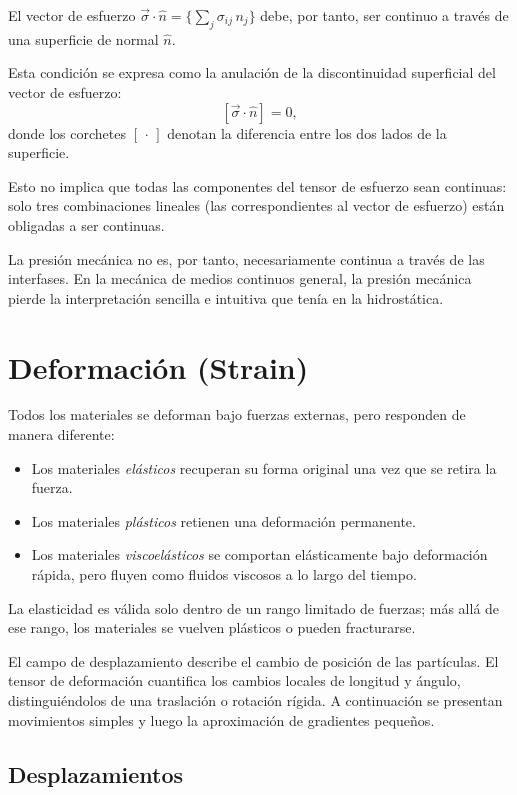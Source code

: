 El vector de esfuerzo $\vec{\sigma}\cdot\hat{n} = \{\sum_j \sigma_{ij}\,n_j\}$ debe, por tanto, ser continuo a través de una superficie de normal $\hat{n}$.

Esta condición se expresa como la anulación de la discontinuidad superficial del vector de esfuerzo:
$$ [\vec{\sigma}\cdot\hat{n}] = 0, $$
donde los corchetes $[\,\cdot\,]$ denotan la diferencia entre los dos lados de la superficie.

Esto no implica que todas las componentes del tensor de esfuerzo sean continuas: solo tres combinaciones lineales (las correspondientes al vector de esfuerzo) están obligadas a ser continuas.

La presión mecánica no es, por tanto, necesariamente continua a través de las interfases. En la mecánica de medios continuos general, la presión mecánica pierde la interpretación sencilla e intuitiva que tenía en la hidrostática.

\section{Deformación (Strain)}

Todos los materiales se deforman bajo fuerzas externas, pero responden de manera diferente:
\begin{itemize}
\item Los materiales \emph{elásticos} recuperan su forma original una vez que se retira la fuerza.
\item Los materiales \emph{plásticos} retienen una deformación permanente.
\item Los materiales \emph{viscoelásticos} se comportan elásticamente bajo deformación rápida, pero fluyen como fluidos viscosos a lo largo del tiempo.
\end{itemize}

La elasticidad es válida solo dentro de un rango limitado de fuerzas; más allá de ese rango, los materiales se vuelven plásticos o pueden fracturarse.

El campo de desplazamiento describe el cambio de posición de las partículas. El tensor de deformación cuantifica los cambios locales de longitud y ángulo, distinguiéndolos de una traslación o rotación rígida. A continuación se presentan movimientos simples y luego la aproximación de gradientes pequeños.

\subsection{Desplazamientos}

